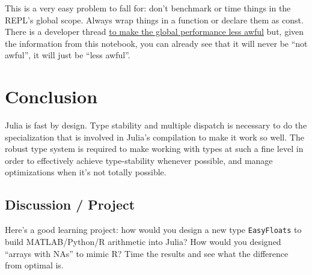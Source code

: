 \documentclass[11pt]{article}
\begin{document}
    This is a very easy problem to fall for: don't benchmark or time things
in the REPL's global scope. Always wrap things in a function or declare
them as const. There is a developer thread
\href{https://github.com/JuliaLang/julia/issues/8870}{to make the global
performance less awful} but, given the information from this notebook,
you can already see that it will never be ``not awful'', it will just be
``less awful''.

    \section{Conclusion}\label{conclusion}

Julia is fast by design. Type stability and multiple dispatch is
necessary to do the specialization that is involved in Julia's
compilation to make it work so well. The robust type system is required
to make working with types at such a fine level in order to effectively
achieve type-stability whenever possible, and manage optimizations when
it's not totally possible.

\subsection{Discussion / Project}\label{discussion-project}

Here's a good learning project: how would you design a new type
\texttt{EasyFloats} to build MATLAB/Python/R arithmetic into Julia? How
would you designed ``arrays with NAs'' to mimic R? Time the results and
see what the difference from optimal is.


    
    
    
    
\end{document}
